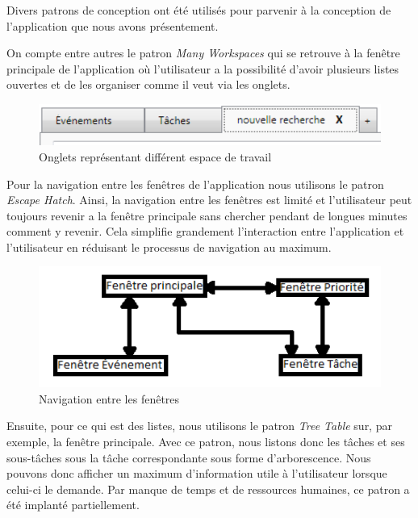 \documentclass[letterpaper, oneside, 12pt, these, creativecommons]{thETS}
\begin{document}
Divers patrons de conception ont été utilisés pour parvenir à la conception de l'application que nous avons présentement. 

On compte entre autres le patron \emph{Many Workspaces} qui se retrouve à la fenêtre principale de l'application où l'utilisateur a la possibilité d'avoir plusieurs listes ouvertes et de les organiser comme il veut via les onglets.

\begin{figure}[H!]
	\centering
	\includegraphics[width=1\textwidth]{many_workspaces.png}
	\caption{Onglets représentant différent espace de travail}
\end{figure}

Pour la navigation entre les fenêtres de l'application nous utilisons le patron \emph{Escape Hatch}. Ainsi, la navigation entre les fenêtres est limité et l'utilisateur peut toujours revenir a la fenêtre principale sans chercher pendant de longues minutes comment y revenir. Cela simplifie grandement l'interaction entre l'application et l'utilisateur en réduisant le processus de navigation au maximum.

\begin{figure}[H!]
	\centering
	\includegraphics[width=1\textwidth]{navigation.png}
	\caption{Navigation entre les fenêtres}
\end{figure}

\newpage

Ensuite, pour ce qui est des listes, nous utilisons le patron \emph{Tree Table} sur, par exemple, la fenêtre principale. Avec ce patron, nous listons donc les tâches et ses sous-tâches sous la tâche correspondante sous forme d'arborescence. Nous pouvons donc afficher un maximum d'information utile à l'utilisateur lorsque celui-ci le demande. Par manque de temps et de ressources humaines, ce patron a été implanté partiellement.
\end{document}
